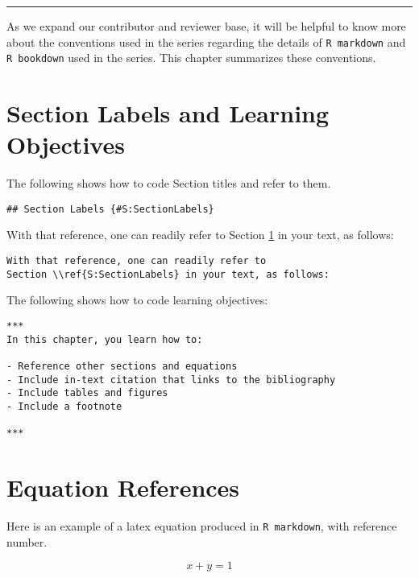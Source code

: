 \documentclass[
]{book}
\begin{document}
\begin{center}\rule{0.5\linewidth}{0.5pt}\end{center}

As we expand our contributor and reviewer base, it will be helpful to know more about the conventions used in the series regarding the details of \texttt{R\ markdown} and \texttt{R\ bookdown} used in the series. This chapter summarizes these conventions.

\hypertarget{S:SectionLabels}{%
\section{Section Labels and Learning Objectives}\label{S:SectionLabels}}

The following shows how to code Section titles and refer to them.

\begin{verbatim}
## Section Labels {#S:SectionLabels}
\end{verbatim}

With that reference, one can readily refer to Section \ref{S:SectionLabels} in your text, as follows:

\begin{verbatim}
With that reference, one can readily refer to 
Section \\ref{S:SectionLabels} in your text, as follows:
\end{verbatim}

The following shows how to code learning objectives:

\begin{verbatim}
***
In this chapter, you learn how to:
  
- Reference other sections and equations
- Include in-text citation that links to the bibliography
- Include tables and figures
- Include a footnote

***

\end{verbatim}

\hypertarget{equation-references}{%
\section{Equation References}\label{equation-references}}

Here is an example of a latex equation produced in \texttt{R\ markdown}, with reference number.

\begin{equation}
  x + y = 1  
\label{eq:ExampleEquation}
\end{equation}
\end{document}
